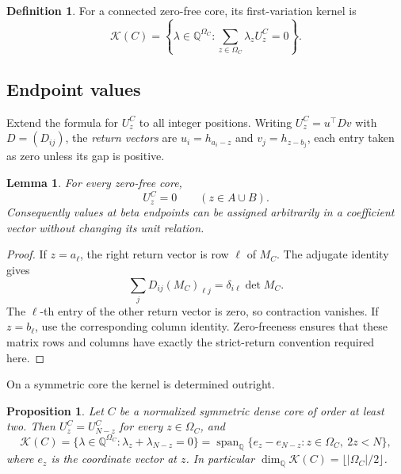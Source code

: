 \documentclass[11pt,a4paper]{amsart}
\numberwithin{equation}{section}
\theoremstyle{plain}
\newtheorem{proposition}[theorem]{Proposition}
\newtheorem{lemma}[theorem]{Lemma}
\theoremstyle{definition}
\newtheorem{definition}[theorem]{Definition}
\newcommand{\Q}{\mathbb Q}
\newcommand{\K}{\mathcal K}
\begin{document}
\begin{definition}
For a connected zero-free core, its first-variation kernel is
\[
 \K(C)=\left\{\lambda\in\Q^{\Omega_C}:
          \sum_{z\in\Omega_C}\lambda_zU_z^C=0\right\}.
\]
\end{definition}

\subsection{Endpoint values}

Extend the formula for \(U_z^C\) to all integer positions.
Writing \(U_z^C=u^{\top}Dv\) with \(D=(D_{ij})\), the \emph{return vectors}
are \(u_i=h_{a_i-z}\) and \(v_j=h_{z-b_j}\), each entry taken as zero unless
its gap is positive.

\begin{lemma}\label{lem:endpoint-cancellation}
For every zero-free core,
\[
 U_z^C=0\qquad(z\in A\cup B).
\]
Consequently values at beta endpoints can be assigned arbitrarily in a
coefficient vector without changing its unit relation.
\end{lemma}

\begin{proof}
If \(z=a_\ell\), the right return vector is row \(\ell\) of \(M_C\).
The adjugate identity gives
\[
 \sum_jD_{ij}(M_C)_{\ell j}=\delta_{i\ell}\det M_C.
\]
The \(\ell\)-th entry of the other return vector is zero, so contraction
vanishes.  If \(z=b_\ell\), use the corresponding column identity.
Zero-freeness ensures that these matrix rows and columns have exactly the
strict-return convention required here.
\end{proof}

On a symmetric core the kernel is determined outright.

\begin{proposition}\label{prop:symmetric-unit-kernel}
Let \(C\) be a normalized symmetric dense core of order at least two.  Then
\(U_z^C=U_{N-z}^C\) for every \(z\in\Omega_C\), and
\[
 \K(C)=\{\lambda\in\Q^{\Omega_C}:\lambda_z+\lambda_{N-z}=0\}
       =\operatorname{span}_{\Q}\{e_z-e_{N-z}:z\in\Omega_C,\ 2z<N\},
\]
where \(e_z\) is the coordinate vector at \(z\).  In particular
\(\dim_{\Q}\K(C)=\lfloor|\Omega_C|/2\rfloor\).
\end{proposition}
\end{document}
